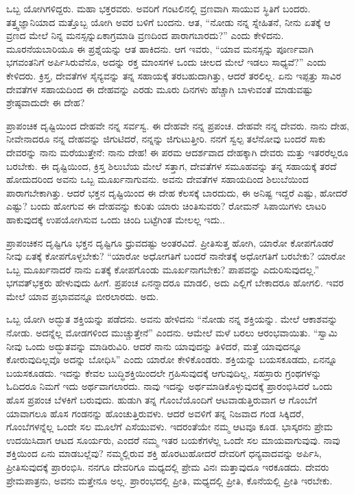 ಒಬ್ಬ ಯೋಗಿಗಳಿದ್ದರು. ಮಹಾ ಭಕ್ತರವರು. ಅವರಿಗೆ ಗಂಟಲಿನಲ್ಲಿ ವ್ರಣವಾಗಿ ಸಾಯುವ ಸ್ಥಿತಿಗೆ ಬಂದರು. ತತ್ತ್ವಜ್ಞಾನಿಯಾದ ಮತ್ತೊಬ್ಬ ಯೋಗಿ ಅವರ ಬಳಿಗೆ ಬಂದನು. ಆತ, “ನೋಡು ನನ್ನ ಸ್ನೇಹಿತನೆ, ನೀನು ಏತಕ್ಕೆ ಆ ವ್ರಣದ ಮೇಲೆ ನಿನ್ನ ಮನಸ್ಸನ್ನು\break ಏಕಾಗ್ರಮಾಡಿ ವ್ರಣದಿಂದ ಪಾರಾಗಬಾರದು?” ಎಂದು ಕೇಳಿದನು. ಮೂರನೆಯ\break ಬಾರಿಯೂ ಈ ಪ್ರಶ್ನೆಯನ್ನು ಆತ ಹಾಕಿದನು. ಆಗ ಇವರು, “ಯಾವ ಮನಸ್ಸನ್ನು ಪೂರ್ಣವಾಗಿ ಭಗವಂತನಿಗೆ ಅರ್ಪಿಸಿರುವೆನೊ, ಅದನ್ನು ರಕ್ತ ಮಾಂಸಗಳ ಒಂದು ಚೀಲದ ಮೇಲೆ ಇಡಲು ಸಾಧ್ಯವೆ?” ಎಂದು ಕೇಳಿದರು. ಕ್ರಿಸ್ತ, ದೇವತೆಗಳ ಸೈನ್ಯವನ್ನು ತನ್ನ ಸಹಾಯಕ್ಕೆ ತರಬಹುದಾಗಿತ್ತು, ಆದರೆ ತರಲಿಲ್ಲ. ಏನು ಇಪ್ಪತ್ತು ಸಾವಿರ ದೇವತೆಗಳ ಸಹಾಯದಿಂದ ಈ ದೇಹವನ್ನು ಎರಡು ಮೂರು ದಿನಗಳು ಹೆಚ್ಚಾಗಿ ಬಾಳುವಂತೆ ಮಾಡುವಷ್ಟು ಶ್ರೇಷ್ಠವಾದುದೇ ಈ ದೇಹ?

ಪ್ರಾಪಂಚಿಕ ದೃಷ್ಟಿಯಿಂದ ದೇಹವೇ ನನ್ನ ಸರ್ವಸ್ವ. ಈ ದೇಹವೇ ನನ್ನ ಪ್ರಪಂಚ. ದೇಹವೇ ನನ್ನ ದೇವರು. ನಾನು ದೇಹ, ನೀವೇನಾದರೂ ನನ್ನ ದೇಹವನ್ನು ಜಿಗುಟಿದರೆ, ನನ್ನನ್ನು ಜಿಗುಟುತ್ತೀರಿ. ನನಗೆ ಸ್ವಲ್ಪ ತಲೆನೋವು ಬಂದರೆ ಸಾಕು ದೇವರನ್ನು ನಾನು ಮರೆಯುತ್ತೇನೆ: ನಾನು ದೇಹ! ಈ ಪರಮ ಆದರ್ಶವಾದ ದೇಹಕ್ಕಾಗಿ ದೇವರು ಮತ್ತು ಇತರರೆಲ್ಲರೂ ಬರಬೇಕು. ಈ ದೃಷ್ಟಿಯಿಂದ, ಕ್ರಿಸ್ತ ಶಿಲುಬೆಯ ಮೇಲೆ ಸತ್ತಾಗ, ದೇವತೆಗಳ ಸಮೂಹವನ್ನು ತನ್ನ ಸಹಾಯಕ್ಕೆ ತರದೆ ಹೋದುದರಿಂದ ಅವನು ಒಬ್ಬ ಮೂರ್ಖನಾಗುವನು. ಅವನು ದೇವತೆಗಳ ಸಹಾಯದಿಂದ ಶಿಲುಬೆಯಿಂದ ಪಾರಾಗಬೇಕಾಗಿತ್ತು. ಆದರೆ ಭಕ್ತನ ದೃಷ್ಟಿಯಿಂದ ಈ ದೇಹ ಕೆಲಸಕ್ಕೆ ಬಾರದುದು, ಈ ಅನಿಷ್ಟ ಇದ್ದರೆ ಎಷ್ಟು, ಹೋದರೆ ಎಷ್ಟು? ಬಂದು ಹೋಗುವ ಈ ದೇಹವನ್ನು ಕುರಿತು ಯಾರು ಚಿಂತಿಸುವರು? ರೋಮನ್ ಸಿಪಾಯಿಗಳು ಲಾಟರಿ ಹಾಕುವುದಕ್ಕೆ ಉಪಯೋಗಿಸುವ ಒಂದು ಚಿಂದಿ ಬಟ್ಟೆಗಿಂತ ಮೇಲಲ್ಲ ಇದು..

ಪ್ರಾಪಂಚಿಕನ ದೃಷ್ಟಿಗೂ ಭಕ್ತನ ದೃಷ್ಟಿಗೂ ಧ್ರುವದಷ್ಟು ಅಂತರವಿದೆ. ಪ್ರೀತಿಸುತ್ತ ಹೋಗಿ, ಯಾರೋ ಕೋಪಗೊಡರೆ ನೀವು ಏತಕ್ಕೆ ಕೋಪಗೊಳ್ಳಬೇಕು? “ಯಾರೋ ಅಧೋಗತಿಗೆ ಬಂದರೆ ನಾನೇತಕ್ಕೆ ಅಧೋಗತಿಗೆ ಬರಬೇಕು? ಯಾರೋ ಒಬ್ಬ ಮೂರ್ಖನಾದರೆ ನಾನು ಏತಕ್ಕೆ ಕೋಪಗೊಂಡು ಮೂರ್ಖನಾಗಬೇಕು? ಪಾಪವನ್ನು ಎದುರಿಸುವುದಲ್ಲ.” ಭಗವತ್‌ಭಕ್ತರು ಹೇಳುವುದು ಹೀಗೆ. ಪ್ರಪಂಚ ಏನನ್ನಾದರೂ ಮಾಡಲಿ, ಅದು ಎಲ್ಲಿಗೆ ಬೇಕಾದರೂ ಹೋಗಲಿ. ಇವರ ಮೇಲೆ ಯಾವ ಪ್ರಭಾವವನ್ನೂ ಬೀರಲಾರದು. ಅದು.

ಒಬ್ಬ ಯೋಗಿ ಅದ್ಭುತ ಶಕ್ತಿಯನ್ನು ಪಡೆದನು. ಅವನು ಹೇಳಿದನು “ನೋಡು ನನ್ನ ಶಕ್ತಿಯನ್ನು. ಮೇಲೆ ಆಕಾಶವನ್ನು ನೋಡು. ಅದನ್ನೆಲ್ಲ ಮೋಡಗಳಿಂದ ಮುಚ್ಚುತ್ತೇನೆ'' ಎಂದನು. ಆಮೇಲೆ ಮಳೆ ಬರಲು ಆರಂಭವಾಯಿತು. “ಸ್ವಾಮಿ ನೀವು ಒಂದು ಅದ್ಭುತವನ್ನು ಮಾಡಿರುವಿರಿ. ಆದರೆ ನಾನು ಯಾವುದನ್ನು ತಿಳಿದರೆ, ಮತ್ತೆ ಯಾವುದನ್ನೂ ಕೋರುವುದಿಲ್ಲವೊ ಅದನ್ನು ಬೋಧಿಸಿ'' ಎಂದು ಯಾರೋ ಕೇಳಿಕೊಂಡರು. ಶಕ್ತಿಯನ್ನು ಬಯಸಕೂಡದು, ಏನನ್ನೂ ಬಯಸಕೂಡದು. ಇದನ್ನು ಕೇವಲ ಬುದ್ಧಿಶಕ್ತಿಯಿಂದಲೇ ಗ್ರಹಿಸುವುದಕ್ಕೆ ಆಗುವುದಿಲ್ಲ, ಸಹಸ್ರಾರು ಗ್ರಂಥಗಳನ್ನು ಓದಿದರೂ ನಿಮಗೆ ಇದು ಅರ್ಥವಾಗಲಾರದು. ನಾವು ಇದನ್ನು ಅರ್ಥಮಾಡಿಕೊಳ್ಳುವುದಕ್ಕೆ ಪ್ರಾರಂಭಿಸಿದರೆ ಒಂದು ಹೊಸ ಪ್ರಪಂಚ ಬೆಳಕಿಗೆ ಬರುವುದು. ಹುಡುಗಿ ತನ್ನ ಗೊಂಬೆಯೊಂದಿಗೆ ಆಟವಾಡುತ್ತಿರುವಾಗ ಆ ಗೊಂಬೆಗೆ ಯಾವಾಗಲೂ ಹೊಸ ಗಂಡನನ್ನು ಹೊಂಚುತ್ತಿರುವಳು. ಆದರೆ ಅವಳಿಗೆ ತನ್ನ ನಿಜವಾದ ಗಂಡ ಸಿಕ್ಕಿದರೆ, ಗೊಂಬೆಗಳನ್ನೆಲ್ಲ ಒಂದೇ ಸಲ ಮೂಲೆಗೆ ಎಸೆಯುವಳು. ಇದರಂತೆಯೇ ನಮ್ಮ ಆಟವೂ ಕೂಡ. ಭಾಸ್ಕರನು ಪ್ರೇಮ ಉದಯಿಸಿದಾಗ ಆಟದ ಸೂರ್ಯರು, ಎಂದರೆ ನಮ್ಮ ಇತರ ಬಯಕೆಗಳೆಲ್ಲ ಒಂದೇ ಸಲ ಮಾಯವಾಗುವುವು. ನಾವು ಶಕ್ತಿಯಿಂದ ಏನು ಮಾಡಬಲ್ಲೆವು? ನಮ್ಮಲ್ಲಿರುವ ಶಕ್ತಿ ಹೊರಟುಹೋದರೆ ದೇವರಿಗೆ ಧನ್ಯವಾದವನ್ನು ಅರ್ಪಿಸಿ, ಪ್ರೀತಿಸುವುದಕ್ಕೆ ಪ್ರಾರಂಭಿಸಿ. ನನಗೂ ದೇವರಿಗೂ ಮಧ್ಯದಲ್ಲಿ ಪ್ರೇಮ ವಿನಃ ಮತ್ತಾವುದೂ ಇರಕೂಡದು. ದೇವರು ಪ್ರೇಮಪಾತ್ರನು, ಅವನು ಮತ್ತೇನೂ ಅಲ್ಲ. ಪ್ರಾರಂಭದಲ್ಲಿ ಪ್ರೀತಿ, ಮಧ್ಯದಲ್ಲಿ ಪ್ರೀತಿ, ಕೊನೆಯಲ್ಲಿ ಪ್ರೀತಿ ಇರಬೇಕು.

